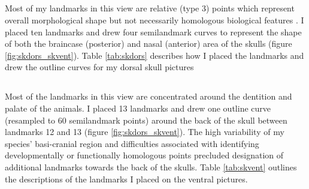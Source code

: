 \subsection{}
	Most of my landmarks in this view are relative (type 3) points which represent overall morphological shape but not necessarily homologous biological features \citep{Zelditch2012}. I placed ten landmarks and drew four semilandmark curves to represent the shape of both the braincase (posterior) and nasal (anterior) area of the skulls (figure \ref{fig:skdors_skvent}). Table \ref{tab:skdors} describes how I placed the landmarks and drew the outline curves for my dorsal skull pictures 

\subsection{}

	Most of the landmarks in this view are concentrated around the dentition and palate of the animals. I placed 13 landmarks and drew one outline curve (resampled to 60 semilandmark points) around the back of the skull between landmarks 12 and 13 (figure \ref{fig:skdors_skvent}). The high variability of my species' basi-cranial region and difficulties associated with identifying developmentally or functionally homologous points precluded designation of additional landmarks towards the back of the skulls. Table \ref{tab:skvent} outlines the descriptions of the landmarks I placed on the ventral pictures.



